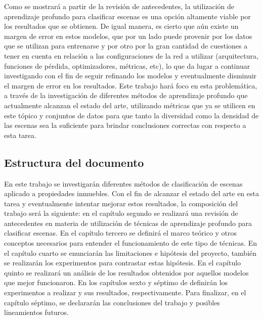 Como se mostrará a partir de la revisión de antecedentes, la utilización de aprendizaje profundo para clasificar escenas es una opción altamente viable por los resultados que se obtienen. De igual manera, es cierto que aún existe un margen de error en estos modelos, que por un lado puede provenir por los datos que se utilizan para entrenarse y por otro por la gran cantidad de cuestiones a tener en cuenta en relación a las configuraciones de la red a utilizar (arquitectura, funciones de pérdida, optimizadores, métricas, etc), lo que da lugar a continuar investigando con el fin de seguir refinando los modelos y eventualmente disminuir el margen de error en los resultados. Este trabajo hará foco en esta problemática, a través de la investigación de diferentes métodos de aprendizaje profundo que actualmente alcanzan el estado del arte, utilizando métricas que ya se utilicen en este tópico y conjuntos de datos para que tanto la diversidad como la densidad de las escenas sea la suficiente para brindar conclusiones correctas con respecto a esta tarea.


\subsection{Estructura del documento}
En este trabajo se investigarán diferentes métodos de clasificación de escenas aplicado a propiedades inmuebles. Con el fin de alcanzar el estado del arte en esta tarea y eventualmente intentar mejorar estos resultados, la composición del trabajo será la siguiente: en el capítulo segundo se realizará una revisión de antecedentes en materia de utilización de técnicas de aprendizaje profundo para clasificar escenas. En el capítulo tercero se definirá el marco teórico y otros conceptos necesarios para entender el funcionamiento de este tipo de técnicas. En el capítulo cuarto se enunciarán las limitaciones e hipótesis del proyecto, también se realizarán los experimentos para contrastar estas hipótesis. En el capítulo quinto se realizará un análisis de los resultados obtenidos por aquellos modelos que mejor funcionaron. En los capítulos sexto y séptimo de definirán los experimentos a realizar y sus resultados, respectivamente. Para finalizar, en el capítulo séptimo, se declararán las conclusiones del trabajo y posibles lineamientos futuros.